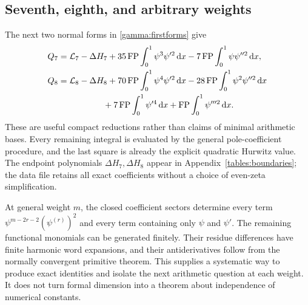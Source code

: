 \subsection{Seventh, eighth, and arbitrary weights}

The next two normal forms in \eqref{gamma:firstforms} give
\begin{align}
 Q_7={}&\mathcal L_7-\Delta H_7
    +35\FP\int_0^1\psi^3\psi'^2\dd x
    -7\FP\int_0^1\psi\psi''^2\dd x,\label{sixth:Q7}\\
 Q_8={}&\mathcal L_8-\Delta H_8
    +70\FP\int_0^1\psi^4\psi'^2\dd x
    -28\FP\int_0^1\psi^2\psi''^2\dd x\notag\\
 &\hspace{14mm}+7\FP\int_0^1\psi'^4\dd x
    +\FP\int_0^1\psi'''^2\dd x.\label{sixth:Q8}
\end{align}
These are useful compact reductions rather than claims of minimal
arithmetic bases.  Every remaining integral is evaluated by the
general pole-coefficient procedure, and the last square is already
the explicit quadratic Hurwitz value.
The endpoint polynomials $\Delta H_7,\Delta H_8$ appear in
Appendix~\ref{tables:boundaries}; the data file retains all exact
coefficients without a choice of even-zeta simplification.

At general weight $m$, the closed coefficient sectors determine every
term $\psi^{m-2r-2}(\psi^{(r)})^2$ and every term containing only
$\psi$ and $\psi'$.  The remaining functional monomials can be
generated finitely.  Their residue differences have finite harmonic
word expansions, and their antiderivatives follow from the normally
convergent primitive theorem.  This supplies a systematic way to
produce exact identities and isolate the next arithmetic question at
each weight.  It does not turn formal dimension into a theorem about
independence of numerical constants.
